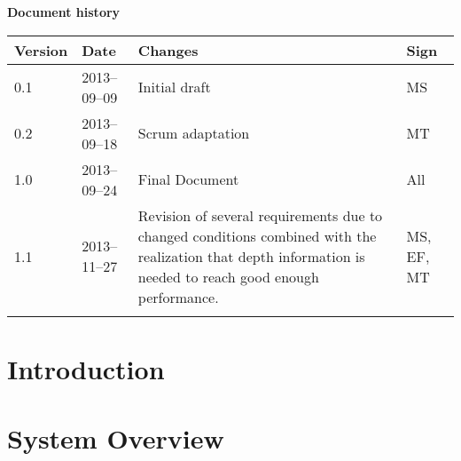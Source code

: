 \documentclass[10pt, a4paper, twoside]{article}
\numberwithin{equation}{subsection}
\numberwithin{figure}{section}
\numberwithin{table}{section}
\begin{document}



\newpage
\pagestyle{fancy}
\setcounter{page}{2} %



\newpage
\tableofcontents
\listoffigures


\newpage
\vspace*{5\baselineskip}

\begin{center}
\textbf{\LARGE Document history}

{ \footnotesize 
\begin{tabular}{|p{1cm}|p{2.0cm}|p{6.5cm}|p{2cm}|}
	\hline
	\textbf{Version} & \textbf{Date} & \textbf{Changes} & \textbf{Sign} \\
	
	\hline
	0.1 & 2013--09--09 & Initial draft & MS \\
	\hline
	0.2 & 2013--09--18 & Scrum adaptation & MT \\
	\hline
	1.0 & 2013--09--24 & Final Document & All \\
	\hline
	1.1 & 2013--11--27 & Revision of several requirements due to changed conditions combined with the realization that depth information is needed to reach good enough performance. & MS, EF, MT \\
	
	\hline
	 &  &  &   \\
	
	\hline
\end{tabular}
}
\end{center}



%
%
\newpage
{}


\newpage
\section{Introduction}
\label{sec:introduction}


\newpage
\section{System Overview}
\label{sec:system_overview}

\end{document}
